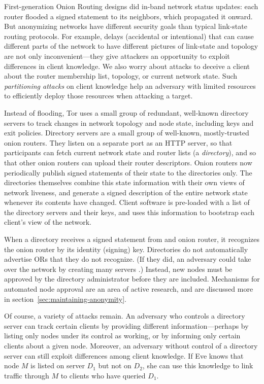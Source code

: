 \documentclass[times,10pt,twocolumn]{article}
\begin{document}
First-generation Onion Routing designs \cite{or-jsac98,freedom2-arch} did
in-band network status updates: each router flooded a signed statement
to its neighbors, which propagated it onward. But anonymizing networks
have different security goals than typical link-state routing protocols.
For example, delays (accidental or intentional)
that can cause different parts of the network to have different pictures
of link-state and topology are not only inconvenient---they give
attackers an opportunity to exploit differences in client knowledge.
We also worry about attacks to deceive a
client about the router membership list, topology, or current network
state. Such \emph{partitioning attacks} on client knowledge help an
adversary with limited resources to efficiently deploy those resources
when attacking a target.

Instead of flooding, Tor uses a small group of redundant, well-known
directory servers to track changes in network topology and node state,
including keys and exit policies.  Directory servers are a small group
of well-known, mostly-trusted onion routers.  They listen on a
separate port as an HTTP server, so that participants can fetch
current network state and router lists (a \emph{directory}), and so
that other onion routers can upload their router descriptors.  Onion
routers now periodically publish signed statements of their state to
the directories only.  The directories themselves combine this state
information with their own views of network liveness, and generate a
signed description of the entire network state whenever its contents
have changed.  Client software is pre-loaded with a list of the
directory servers and their keys, and uses this information to
bootstrap each client's view of the network.

When a directory receives a signed statement from and onion router, it
recognizes the onion router by its identity (signing) key.
Directories do not automatically advertise ORs that they do not
recognize.  (If they did, an adversary could take over the network by
creating many servers \cite{sybil}.)  Instead, new nodes must be
approved by the directory administrator before they are included.
Mechanisms for automated node approval are an area of active research,
and are discussed more in section~\ref{sec:maintaining-anonymity}.
  
Of course, a variety of attacks remain. An adversary who controls a
directory server can track certain clients by providing different
information---perhaps by listing only nodes under its control
as working, or by informing only certain clients about a given
node. Moreover, an adversary without control of a directory server can
still exploit differences among client knowledge. If Eve knows that
node $M$ is listed on server $D_1$ but not on $D_2$, she can use this
knowledge to link traffic through $M$ to clients who have queried $D_1$.
\end{document}
